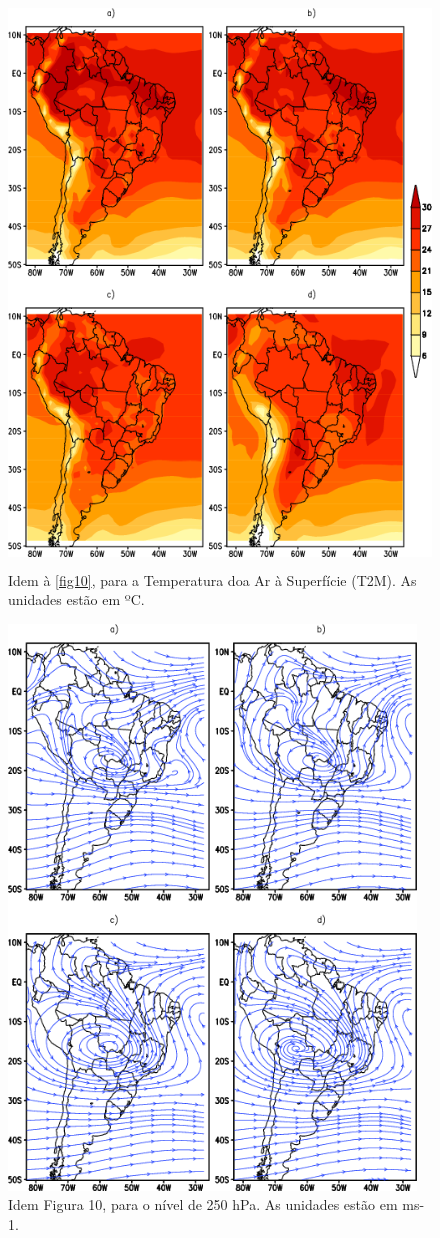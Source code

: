 \begin{figure}[!hbp]
\centering
\includegraphics[height=15cm]{./figs/media_tp2m_anl.png}
\caption{Idem à \autoref{fig10}, para a Temperatura doa Ar à Superfície (T2M). As unidades estão em ºC.}
\label{fig11}
\end{figure}

\begin{figure}[!hbp]
\centering
\includegraphics[height=15cm]{./figs/media_corrente_anl_250hPa.png}
\caption{Idem Figura 10, para o nível de 250 hPa. As unidades estão em ms-1.}
\label{fig12}
\end{figure}


